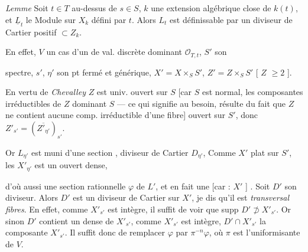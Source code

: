 \documentclass[11pt,a4paper]{article}
\begin{document}
\emph{Lemme} Soit $t\in T$ au-dessus de $s\in S$,   $k$ une
 extension algébrique close de $k(t)$, et $\underline{L}_t$ le Module sur
$X_k$ défini par $t$. Alors $L_t$ est définissable par un diviseur de Cartier positif
$\subset Z_k$.

En effet, \ill{} $V$ un \ill{} cas d'un  de val. discrète dominant
$\mathcal{O}_{T,t}$, $S'$ son



spectre, $s'$, $\eta'$ son pt fermé et générique, $X'=X\times_S S'$,
$Z'=Z\times_S S'$ [\ill{} $Z$ \ill{} \ill{}  $\geq 2$ \ill{}
 ].

\struck{\ill{}} En vertu de \emph{Chevalley}  $Z$ est univ. ouvert sur $S$ [car
$S$ est normal, les composantes irréductibles de $Z$ dominant $S$ --- ce qui signifie au
besoin, résulte du fait que $Z$ ne contient aucune comp. irréductible d'une fibre]
\ill{} ouvert sur $S'$, donc $Z'_{s'}=(\overline{Z'_{\eta'}})_{s'}$.

Or $L_{\eta'}$ est muni d'une section ,
\struck{\ill{}} \add{\ill{}} diviseur de Cartier $D_{\eta'}$,  Comme
$X'$ plat sur $S'$, les $X'_{\eta'}$ est un ouvert dense,

d'où aussi une section rationnelle $\varphi$ de $L'$, et en fait une
  \struck{\ill{}} 
[car  \ill{} : $X'$ ] . Soit $D'$ son diviseur. Alors $D'$ est un diviseur de
Cartier  sur $X'$, \struck{\ill{}} je
dis qu'il est \emph{transversal  fibres}. En effet, comme $X'_{s'}$ est
intègre, il suffit de voir que supp $D'\not\supset X'_{s'}$. Or sinon \struck{\ill{}} $D'$
contient un  dense de $X'_{s'}$, \struck{\ill{}} comme $X'_{s'}$ est
intègre, $D'\cap X'_{s'}$ \struck{\ill{}} \ill{} la composante $X'_{s'}$. Il suffit donc de
remplacer $\varphi$ par $\pi^{-n}\varphi$, où $\pi$ est l'uniformisante de $V$.
\end{document}
